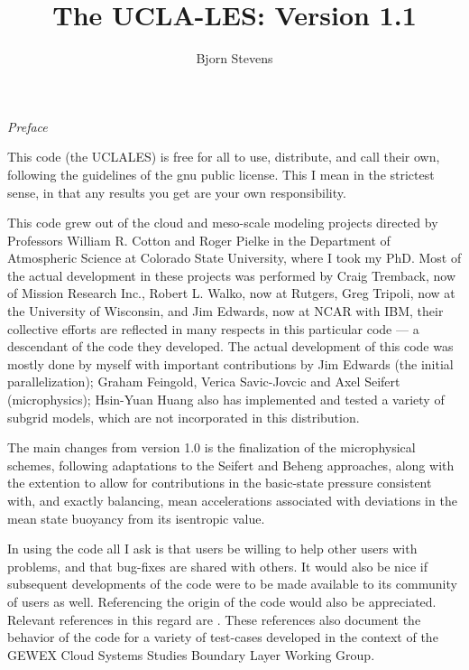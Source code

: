 \documentclass[11pt,a4paper]{article}
\begin{document}
 

\title{The UCLA-LES:  Version 1.1}

\baselineskip7mm
\author{Bjorn Stevens} \maketitle

\centerline{\Large \it Preface} \small \baselineskip5mm

This code (the UCLALES) is free for all to use, distribute, and call
their own, following the guidelines of the gnu public license.  This I
mean in the strictest sense, in that any results you get are your own
responsibility.

This code grew out of the cloud and meso-scale modeling projects
directed by Professors William R. Cotton and Roger Pielke in the
Department of Atmospheric Science at Colorado State University, where
I took my PhD.  Most of the actual development in these projects was
performed by Craig Tremback, now of Mission Research Inc., Robert
L. Walko, now at Rutgers, Greg Tripoli, now at the University of
Wisconsin, and Jim Edwards, now at NCAR with IBM, their collective
efforts are reflected in many respects in this particular code --- a
descendant of the code they developed.  The actual development of this
code was mostly done by myself with important contributions by Jim
Edwards (the initial parallelization); Graham Feingold, Verica
Savic-Jovcic and Axel Seifert (microphysics); Hsin-Yuan Huang also has
implemented and tested a variety of subgrid models, which are not
incorporated in this distribution.

The main changes from version 1.0 is the finalization of the
microphysical schemes, following adaptations to the Seifert and Beheng
approaches, along with the extention to allow for contributions in the
basic-state pressure consistent with, and exactly balancing, mean
accelerations associated with deviations in the mean state buoyancy
from its isentropic value.

In using the code all I ask is that users be willing to help other
users with problems, and that bug-fixes are shared with others.  It
would also be nice if subsequent developments of the code were to be
made available to its community of users as well.  Referencing the
origin of the code would also be appreciated.  Relevant references in
this regard are \cite{Me:1999a,Me:2005b,Me:2008}.  These references
also document the behavior of the code for a variety of test-cases
developed in the context of the GEWEX Cloud Systems Studies Boundary
Layer Working Group.
\end{document}
